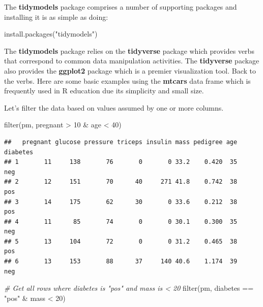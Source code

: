 \documentclass[
]{article}
\newenvironment{Shaded}{\begin{snugshade}}{\end{snugshade}}
\newcommand{\CommentTok}[1]{\textcolor[rgb]{0.56,0.35,0.01}{\textit{#1}}}
\newcommand{\DecValTok}[1]{\textcolor[rgb]{0.00,0.00,0.81}{#1}}
\newcommand{\FunctionTok}[1]{\textcolor[rgb]{0.00,0.00,0.00}{#1}}
\newcommand{\NormalTok}[1]{#1}
\newcommand{\SpecialCharTok}[1]{\textcolor[rgb]{0.00,0.00,0.00}{#1}}
\newcommand{\StringTok}[1]{\textcolor[rgb]{0.31,0.60,0.02}{#1}}
\begin{document}
The \textbf{tidymodels} package comprises a number of supporting
packages and installing it is as simple as doing:

\begin{Shaded}
\begin{Highlighting}[]
\FunctionTok{install.packages}\NormalTok{(}\StringTok{"tidymodels"}\NormalTok{)}
\end{Highlighting}
\end{Shaded}

The \textbf{tidymodels} package relies on the \textbf{tidyverse} package
which provides verbs that correspond to common data manipulation
activities. The \textbf{tidyverse} package also provides the
\textbf{ggplot2} package which is a premier visualization tool. Back to
the verbs. Here are some basic examples using the \textbf{mtcars} data
frame which is frequently used in R education due its simplicity and
small size.

Let's filter the data based on values assumed by one or more columns.

\begin{Shaded}
\begin{Highlighting}[]
\FunctionTok{filter}\NormalTok{(pm, pregnant }\SpecialCharTok{\textgreater{}} \DecValTok{10} \SpecialCharTok{\&}\NormalTok{ age }\SpecialCharTok{\textless{}} \DecValTok{40}\NormalTok{)}
\end{Highlighting}
\end{Shaded}

\begin{verbatim}
##   pregnant glucose pressure triceps insulin mass pedigree age diabetes
## 1       11     138       76       0       0 33.2    0.420  35      neg
## 2       12     151       70      40     271 41.8    0.742  38      pos
## 3       14     175       62      30       0 33.6    0.212  38      pos
## 4       11      85       74       0       0 30.1    0.300  35      neg
## 5       13     104       72       0       0 31.2    0.465  38      pos
## 6       13     153       88      37     140 40.6    1.174  39      neg
\end{verbatim}

\begin{Shaded}
\begin{Highlighting}[]
\CommentTok{\# Get all rows where diabetes is "pos" and mass is \textless{} 20}
\FunctionTok{filter}\NormalTok{(pm, diabetes }\SpecialCharTok{==} \StringTok{"pos"} \SpecialCharTok{\&}\NormalTok{ mass }\SpecialCharTok{\textless{}} \DecValTok{20}\NormalTok{)}
\end{Highlighting}
\end{Shaded}
\end{document}
